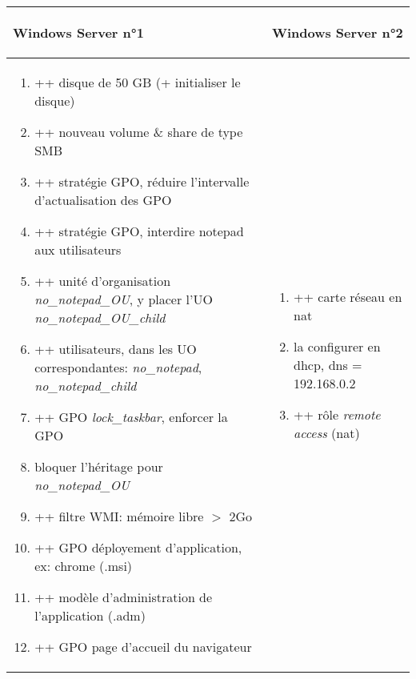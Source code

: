 \documentclass[a4paper]{article}
\begin{document}
\begin{center}
    \begin{tabular}{|p{7.5cm}|p{7.5cm}|} \hline

        \begin{center} \textbf{Windows Server n°1} \end{center} &
        \begin{center} \textbf{Windows Server n°2} \end{center} \\ \hline

        \begin{enumerate}
            \item ++ disque de 50 GB (+ initialiser le disque)
            \item ++ nouveau volume \& share de type SMB
            \item ++ stratégie GPO, réduire l'intervalle d'actualisation des GPO
            \item ++ stratégie GPO, interdire notepad aux utilisateurs
            \item ++ unité d'organisation \textit{no\_notepad\_OU}, y placer l'UO \textit{no\_notepad\_OU\_child}
            \item ++  utilisateurs, dans les UO correspondantes: \textit{no\_notepad}, \textit{no\_notepad\_child}
            \item ++ GPO \textit{lock\_taskbar}, enforcer la GPO
            \item bloquer l'héritage pour \textit{no\_notepad\_OU}
            \item ++ filtre WMI: mémoire libre $ > $ 2Go
            \item ++ GPO déployement d'application, ex: chrome (.msi)
            \item ++ modèle d'administration de l'application (.adm)
            \item ++ GPO page d'accueil du navigateur
        \end{enumerate}
        &
        \begin{enumerate}
            \item ++ carte réseau en nat
            \item la configurer en dhcp, dns = 192.168.0.2
            \item ++ rôle \textit{remote access} (nat)
        \end{enumerate}

        \\ \hline
        

\end{tabular}
\end{center}
\end{document}
